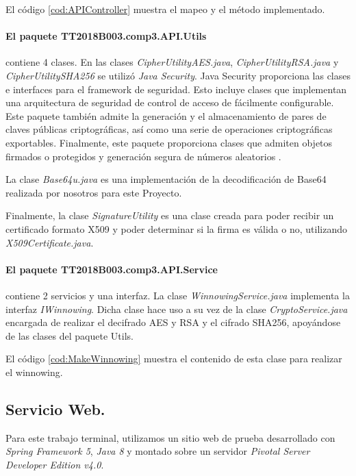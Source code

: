\documentclass[12pt, a4paper, titlepage]{report}
\begin{document}
        	        El código \ref{cod:APIController} muestra el mapeo y el método implementado.
        	        
        	        
        	        
        	        \paragraph{El paquete TT2018B003.comp3.API.Utils} contiene 4 clases. En las clases \textit{CipherUtilityAES.java}, \textit{CipherUtilityRSA.java} y \textit{CipherUtilitySHA256} se utilizó \textit{Java Security}. Java Security proporciona las clases e interfaces para el framework de seguridad. Esto incluye clases que implementan una arquitectura de seguridad de control de acceso de fácilmente configurable. Este paquete también admite la generación y el almacenamiento de pares de claves públicas criptográficas, así como una serie de operaciones criptográficas exportables. Finalmente, este paquete proporciona clases que admiten objetos firmados o protegidos y generación segura de números aleatorios \cite{refJavaSecurity}.
        	        
        	        La clase \textit{Base64u.java} es una implementación de la decodificación de Base64 realizada por nosotros para este Proyecto.
        	        
        	        Finalmente, la clase \textit{SignatureUtility} es una clase creada para poder recibir un certificado formato X509 y poder determinar si la firma es válida o no, utilizando \textit{X509Certificate.java}.
        	        
        	        \paragraph{El paquete TT2018B003.comp3.API.Service} contiene 2 servicios y una interfaz. La clase \textit{WinnowingService.java} implementa la interfaz \textit{IWinnowing}. Dicha clase hace uso a su vez de la clase \textit{CryptoService.java} encargada de realizar el decifrado AES y RSA y el cifrado SHA256, apoyándose de las clases del paquete Utils.
        	        
        	        El código \ref{cod:MakeWinnowing} muestra el contenido de esta clase para realizar el winnowing.
        	        
        	        
	        \subsection{Servicio Web.}
	            Para este trabajo terminal, utilizamos un sitio web de prueba desarrollado con \textit{Spring Framework 5}, \textit{Java 8} y montado sobre un servidor \textit{Pivotal Server Developer Edition v4.0}.
	            
\end{document}
